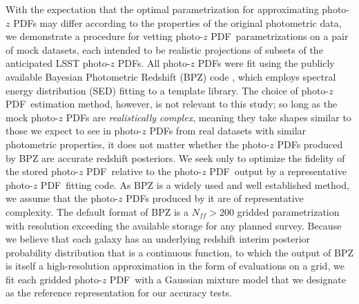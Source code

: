 \documentclass[\docopts]{\docclass}
\newcommand{\pz}{photo-$z$ PDF}
\begin{document}
With the expectation that the optimal parametrization for approximating \pz s 
may differ according to the properties of the original photometric data, we 
demonstrate a procedure for vetting \pz\ parametrizations on a pair of mock 
datasets, each intended to be realistic projections of subsets of the 
anticipated LSST \pz s.
All \pz s were fit using the publicly available Bayesian Photometric Redshift 
(BPZ) code \citep{benitez_bayesian_2000}, which employs spectral energy 
distribution (SED) fitting to a template library.
The choice of \pz\ estimation method, however, is not relevant to this study; 
so long as the mock \pz s are \textit{realistically complex}, meaning they take 
shapes similar to those we expect to see in \pz s from real datasets with 
similar photometric properties, it does not matter whether the \pz s produced 
by BPZ are accurate redshift posteriors.
We seek only to optimize the fidelity of the stored \pz\ relative to the \pz\ 
output by a representative \pz\ fitting code.
\citep[See][Schmidt, et al.\ in preparation for other work comparing the 
accuracy of \pz s produced by different methods.]{tanaka_photometric_2017}
As BPZ is a widely used and well established method, we assume that the \pz s 
produced by it are of representative complexity.
The default format of BPZ is a $N_{ff}>200$ gridded parametrization with 
resolution exceeding the available storage for any planned survey.
Because we believe that each galaxy has an underlying redshift interim 
posterior probability distribution that is a continuous function, to which the 
output of BPZ is itself a high-resolution approximation in the form of 
evaluations on a grid, we fit each gridded \pz\ with a Gaussian mixture model 
that we designate as the reference representation for our accuracy tests.
\end{document}

